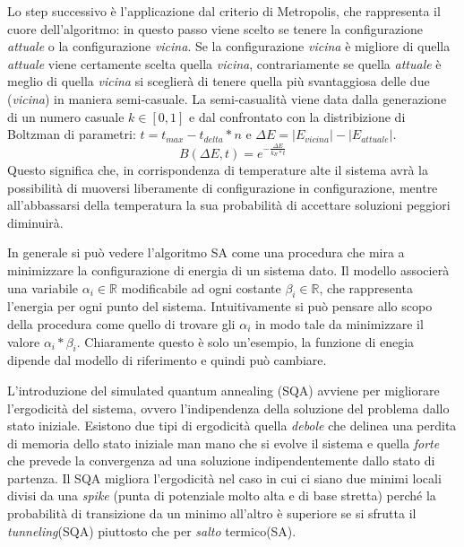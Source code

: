 Lo step successivo è l'applicazione dal criterio di Metropolis, che rappresenta il cuore dell'algoritmo: in questo passo viene scelto se tenere la configurazione \textit{attuale} o la configurazione \textit{vicina}. Se la configurazione \textit{vicina} è migliore di quella \textit{attuale} viene certamente scelta quella \textit{vicina}, contrariamente se quella \textit{attuale} è meglio di quella \textit{vicina} si sceglierà di tenere quella più svantaggiosa delle due (\textit{vicina}) in maniera semi-casuale.
La semi-casualità viene data dalla generazione di un numero casuale $k \in [0,1]$ e dal confrontato con la distribizione di Boltzman di parametri: $t = t_{max} - t_{delta} * n$ e $\Delta E = |E_{vicina}| - |E_{attuale}|$.
$$B(\Delta E, t) = e^{- \frac{\Delta E}{k_B * t}}$$
Questo significa che, in corrispondenza di temperature alte il sistema avrà la possibilità di muoversi liberamente di configurazione in configurazione, mentre all’abbassarsi della temperatura la sua probabilità di accettare soluzioni peggiori diminuirà.

In generale si può vedere l'algoritmo SA come una procedura che mira a minimizzare la configurazione di energia di un sistema dato. Il modello associerà una variabile $\alpha_i \in \mathbb{R}$ modificabile ad ogni costante $\beta_i \in \mathbb{R}$, che rappresenta l'energia per ogni punto del sistema. Intuitivamente si può pensare allo scopo della procedura come quello di trovare gli $\alpha_i$ in modo tale da minimizzare il valore $\alpha_i * \beta_i$. Chiaramente questo è solo un'esempio, la funzione di enegia dipende dal modello di riferimento e quindi può cambiare.

L'introduzione del simulated quantum annealing (SQA) avviene per migliorare l'ergodicità del sistema, ovvero l'indipendenza della soluzione del problema dallo stato iniziale. Esistono due tipi di ergodicità quella \textit{debole} che delinea una perdita di memoria dello stato iniziale man mano che si evolve il sistema e quella \textit{forte} che prevede la convergenza ad una soluzione indipendentemente dallo stato di partenza. Il SQA migliora l'ergodicità nel caso in cui ci siano due minimi locali divisi da una \textit{spike} (punta di potenziale molto alta e di base stretta) perché la probabilità di transizione da un minimo all'altro è superiore se si sfrutta il \textit{tunneling}(SQA) piuttosto che per \textit{salto} termico(SA).

